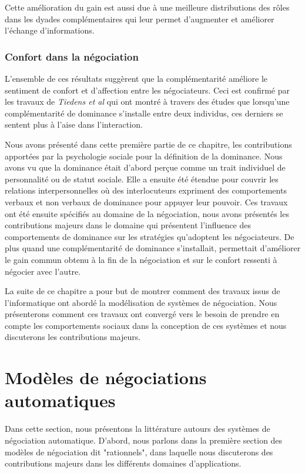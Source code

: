 	Cette amélioration du gain est aussi due à une meilleure distributions des rôles dans les dyades complémentaires qui leur permet d'augmenter et améliorer l'échange d'informations. 
		\subsubsection*{Confort dans la négociation}
	L'ensemble de ces résultats suggèrent que la complémentarité améliore le sentiment de confort et d'affection entre les négociateurs. Ceci est confirmé par les travaux de \emph{Tiedens et al} \cite{tiedens2003power} qui ont montré à travers des études que lorsqu'une complémentarité de dominance s'installe entre deux individus, ces derniers se sentent plus à l'aise dans l'interaction. 
	
	
	Nous avons présenté dans cette première partie de ce chapitre, les contributions apportées par la psychologie sociale pour la définition de la dominance. Nous avons vu que la dominance était d'abord perçue comme un trait individuel de personnalité ou de statut sociale. Elle a ensuite été étendue pour couvrir les relations interpersonnelles où des interlocuteurs expriment des comportements verbaux et non verbaux de dominance pour appuyer leur pouvoir. 
	Ces travaux ont été ensuite spécifiés au domaine de la négociation, nous avons présentés les contributions majeurs dans le domaine qui présentent l'influence des comportements de dominance sur les stratégies qu'adoptent les négociateurs. De plus quand une complémentarité de dominance s'installait, permettait d'améliorer le gain commun obtenu à la fin de la négociation et sur le confort ressenti à négocier avec l'autre.
	
	
	La suite de ce chapitre a pour but de montrer comment des travaux issus de l'informatique ont abordé la modélisation de systèmes de négociation. Nous présenterons comment ces travaux ont convergé vers le besoin de prendre en compte les comportements sociaux dans la conception de ces systèmes et nous discuterons les contributions majeurs.  
	
	
	


	\section{Modèles de négociations automatiques}
		Dans cette section, nous présentons la littérature autours des systèmes de négociation automatique. D'abord, nous parlons dans la première section des modèles de négociation dit "rationnels", dans laquelle nous discuterons des contributions majeurs dans les différents domaines d'applications. 
		
